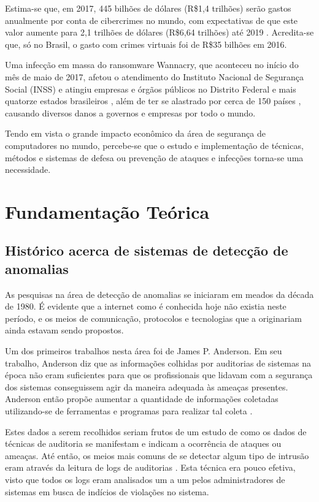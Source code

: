 \documentclass[openright]{normas-utf-tex} %
\begin{document}
	Estima-se que, em 2017, 445 bilhões de dólares (R\$1,4 trilhões) serão gastos anualmente por conta de cibercrimes no mundo, com expectativas de que este valor aumente para 2,1 trilhões de dólares (R\$6,64 trilhões) até 2019 \cite{computerworld}. Acredita-se que, só no Brasil, o gasto com crimes virtuais foi de R\$35 bilhões em 2016\cite{gazeta}.
	
	Uma infecção em massa do ransomware Wannacry, que aconteceu no início do mês de maio de 2017, afetou o atendimento do Instituto Nacional de Segurança Social (INSS) e atingiu empresas e órgãos públicos no Distrito Federal e mais quatorze estados brasileiros \cite{g1}, além de ter se alastrado por cerca de 150 países \cite{elpais}, causando diversos danos a governos e empresas por todo o mundo.
	
	Tendo em vista o grande impacto econômico da área de segurança de computadores no mundo, percebe-se que o estudo e implementação de técnicas, métodos e sistemas de defesa ou prevenção de ataques e infecções torna-se uma necessidade.

\chapter{Fundamentação Teórica}
\label{chap:fund}

\section{Histórico acerca de sistemas de detecção de anomalias}

As pesquisas na área de detecção de anomalias se iniciaram em meados da década de 1980. É evidente que a internet como é conhecida hoje não existia neste período, e os meios de comunicação, protocolos e tecnologias que a originariam ainda estavam sendo propostos.

	Um dos primeiros trabalhos nesta área foi de James P. Anderson. Em seu trabalho, Anderson diz que as informações colhidas por auditorias de sistemas na época não eram suficientes para que os profissionais que lidavam com a segurança dos sistemas conseguissem agir da maneira adequada às ameaças presentes. Anderson então propõe aumentar a quantidade de informações coletadas utilizando-se de ferramentas e programas para realizar tal coleta \cite{jamesAnderson}. 
	
	Estes dados a serem recolhidos seriam frutos de um estudo de como os dados de técnicas de auditoria se manifestam e indicam a ocorrência de ataques ou ameaças.
	Até então, os meios mais comuns de se detectar algum tipo de intrusão eram através da leitura de logs de auditorias \cite{idshistory}. Esta técnica era pouco efetiva, visto que todos os logs eram analisados um a um pelos administradores de sistemas em busca de indícios de violações no sistema.
	
\end{document}
